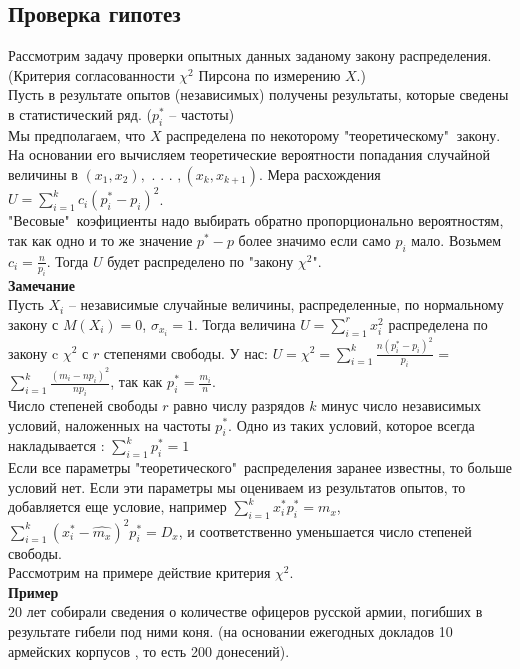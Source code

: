 \documentclass[russian, 12pt, fleqn]{article}
\begin{document}
\subsection{Проверка гипотез}
Рассмотрим задачу проверки опытных данных заданому закону распределения.(Критерия согласованности $\chi^2$ Пирсона по измерению $X$.)\\
Пусть в результате опытов (независимых) получены результаты, которые сведены в статистический ряд. ($p_i^*$ -- частоты)\\
Мы предполагаем, что $X$ распределена по некоторому "теоретическому"$\ $ закону. На основании его вычисляем теоретические вероятности попадания случайной величины в $(x_1,x_2),$ . . . $,(x_k, x_{k+1})$. Мера расхождения $U = \displaystyle{\sum \limits_{i = 1} ^ {k}} c_i(p_i^* - p_i)^2$. \\
"Весовые"\  коэфициенты надо выбирать обратно пропорционально  вероятностям, так как одно и то же значение $p^*-p$ более значимо  если само $p_i$ мало. Возьмем $c_i=\frac{n}{p_i}$. Тогда $U$ будет распределено по "закону $\chi^2$".\\
\textbf{Замечание\ } \\
Пусть $X_i$ -- независимые случайные величины, распределенные, по нормальному закону с $M(X_i) = 0$, $\sigma_{x_i} = 1$. Тогда величина $U = \displaystyle{\sum \limits_{i  = 1}^{r}} x_i^2$ распределена по закону c $\chi^2$ с $r$ степенями свободы. У нас: $U = \chi^2 = \displaystyle{\sum \limits_{i = 1}^{k}} \frac{n(p_i^* - p_i)^2}{p_i}$ = $\displaystyle{\sum \limits_{i = 1}^{k}} \frac{(m_i - np_i)^2}{n p_i}$,  так как $p_i^* = \frac{m_i}{n}$.\\
Число степеней свободы $r$ равно числу разрядов $k$ минус число независимых условий, наложенных на частоты $p_i^*$. Одно из таких условий, которое всегда накладывается : $\displaystyle{\sum \limits _{i = 1} ^ {k}} p_i^* = 1$\\
Если все параметры "теоретического"\ распределения заранее известны, то больше условий нет. Если эти параметры мы оцениваем из результатов опытов, то добавляется еще условие, например $\displaystyle{\sum \limits_{i = 1} ^ {k}} x_i^* p_i^* = m_x$, $\displaystyle{\sum \limits_{i = 1} ^ {k}}( x_i^* - \hat{m_x} )^2 p_i^* = D_x$, и соответственно уменьшается число степеней свободы.\\
Рассмотрим на примере действие критерия $\chi^2$.\\
\textbf{Пример}\\
$20$ лет собирали сведения о количестве офицеров русской армии, погибших в результате гибели под ними коня. (на основании ежегодных докладов 10 армейских корпусов , то есть 200 донесений).\\
\end{document}
